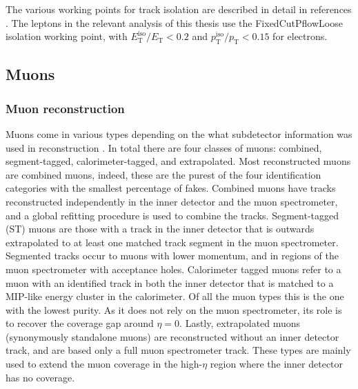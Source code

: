 The various working points for track isolation are described in detail in references \cite{ATLAS_electron_efficiency_2015-2016,ATLAS_electron_efficiency_2015-2017}. The leptons in the relevant analysis of this thesis use the FixedCutPflowLoose isolation working point, with $E_{\text{T}}^{\text{iso}}/E_{\text{T}}<0.2$ and $p_{\text{T}}^{\text{iso}}/p_{\text{T}}<0.15$ for electrons. 

\subsection{Muons}
\label{ssec:muonreco}
\subsubsection{Muon reconstruction}

Muons come in various types depending on the what subdetector information was used in reconstruction \cite{ATLAS_muon_reco_2015}. In total there are four classes of muons: combined, segment-tagged, calorimeter-tagged, and extrapolated. Most reconstructed muons are combined muons, indeed, these are the purest of the four identification categories with the smallest percentage of fakes. Combined muons have tracks reconstructed independently in the inner detector and the muon spectrometer, and a global refitting procedure is used to combine the tracks. Segment-tagged (ST) muons are those with a track in the inner detector that is outwards extrapolated to at least one matched track segment in the muon spectrometer. Segmented tracks occur to muons with lower momentum, and in regions of the muon spectrometer with acceptance holes. Calorimeter tagged muons refer to a muon with an identified track in both the inner detector that is matched to a MIP-like energy cluster in the calorimeter. Of all the muon types this is the one with the lowest purity. As it does not rely on the muon spectrometer, its role is to recover the coverage gap around $\eta=0$. Lastly, extrapolated muons (synonymously standalone muons) are reconstructed without an inner detector track, and are based only a full muon spectrometer track. These types are mainly used to extend the muon coverage in the high-$\eta$ region where the inner detector has no coverage. 

